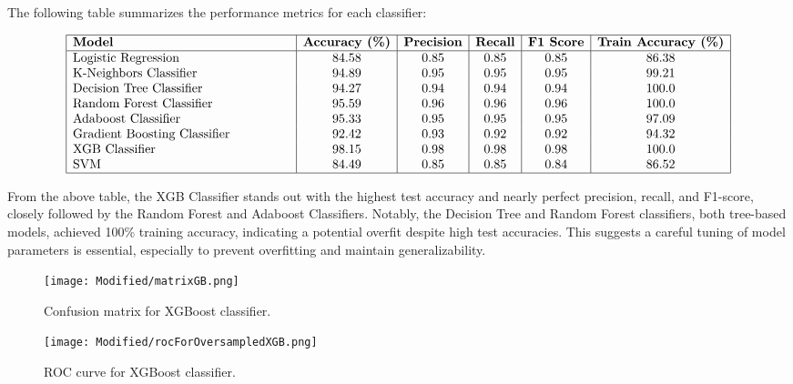\documentclass[a4paper,num-refs,gigabyte]{oup-contemporary}
\begin{document}
The following table summarizes the performance metrics for each classifier:

\[
\begin{array}{|>{\raggedright\arraybackslash}p{6cm}|c|c|c|c|c|}
\hline
\textbf{Model} & \textbf{Accuracy (\%)} & \textbf{Precision} & \textbf{Recall} & \textbf{F1 Score} & \textbf{Train Accuracy (\%)} \\
\hline
\text{Logistic Regression} & 84.58 & 0.85 & 0.85 & 0.85 & 86.38 \\
\text{K-Neighbors Classifier} & 94.89 & 0.95 & 0.95 & 0.95 & 99.21 \\
\text{Decision Tree Classifier} & 94.27 & 0.94 & 0.94 & 0.94 & 100.0 \\
\text{Random Forest Classifier} & 95.59 & 0.96 & 0.96 & 0.96 & 100.0 \\
\text{Adaboost Classifier} & 95.33 & 0.95 & 0.95 & 0.95 & 97.09 \\
\text{Gradient Boosting Classifier} & 92.42 & 0.93 & 0.92 & 0.92 & 94.32 \\
\text{XGB Classifier} & 98.15 & 0.98 & 0.98 & 0.98 & 100.0 \\
\text{SVM} & 84.49 & 0.85 & 0.85 & 0.84 & 86.52 \\
\hline
\end{array}
\]

From the above table, the XGB Classifier stands out with the highest test accuracy and nearly perfect precision, recall, and F1-score, closely followed by the Random Forest and Adaboost Classifiers. Notably, the Decision Tree and Random Forest classifiers, both tree-based models, achieved 100\% training accuracy, indicating a potential overfit despite high test accuracies. This suggests a careful tuning of model parameters is essential, especially to prevent overfitting and maintain generalizability.

\begin{figure*}[ht]
    \begin{minipage}[b]{0.5\linewidth}
        \centering
        \texttt{[image: Modified/matrixGB.png]}
        \captionsetup{justification=centering, singlelinecheck=off} %
        \caption{Confusion matrix for XGBoost classifier.}
        \label{fig:ConfusionMatrix}
    \end{minipage}
    \begin{minipage}[b]{0.5\linewidth}
        \centering
        \texttt{[image: Modified/rocForOversampledXGB.png]}
        \captionsetup{justification=centering, singlelinecheck=off} %
        \caption{ROC curve for XGBoost classifier.}
        \label{fig:RocCurve}
    \end{minipage}
\end{figure*}
\end{document}
